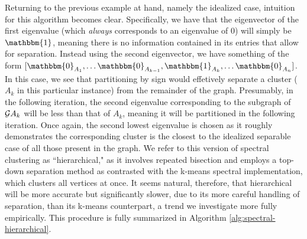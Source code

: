 \documentclass[journal]{IEEEtran}
\begin{document}
Returning to the previous example at hand, namely the idealized case, intuition for this algorithm becomes clear. Specifically, we have that the eigenvector of the first eigenvalue (which \textit{always} corresponds to an eigenvalue of 0) will simply be $\mathbbm{1}$, meaning there is no information contained in its entries that allow for separation. Instead using the second eigenvector, we have something of the form $[\mathbbm{0}_{A_1},\dots\mathbbm{0}_{A_{k-1}},\mathbbm{1}_{A_k},\dots\mathbbm{0}_{A_n}]$. In this case, we see that partitioning by sign would effetively separate a cluster ($A_k$ in this particular instance) from the remainder of the graph. Presumably, in the following iteration, the second eigenvalue corresponding to the subgraph of $\mathcal{G}\\A_k$ will be less than that of $A_k$, meaning it will be partitioned in the following iteration. Once again, the second lowest eigenvalue is chosen as it roughly demonstrates the corresponding cluster is the closest to the idealized separable case of all those present in the graph. We refer to this version of spectral clustering as ``hierarchical," as it involves repeated bisection and employs a top-down separation method as contrasted with the k-means spectral implementation, which clusters all vertices at once. It seems natural, therefore, that hierarchical will be more accurate but significantly slower, due to its more careful handling of separation, than its k-means counterpart, a trend we investigate more fully empirically. This procedure is fully summarized in Algorithm \ref{alg:spectral-hierarchical}. 
\end{document}
